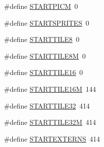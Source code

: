 \begin{DoxyCompactItemize}
\#define \hyperlink{GFXE__WL6_8H_abd418cd2e72de01524b8400b58ad8273}{STARTPICM}~0
\item 
\#define \hyperlink{GFXE__WL6_8H_a08f15ca2b66024c7df43a601df18e33a}{STARTSPRITES}~0
\item 
\#define \hyperlink{GFXE__WL6_8H_a63a36c8955b74ee16ba0fc61f4d62478}{STARTTILE8}~0
\item 
\#define \hyperlink{GFXE__WL6_8H_a56df7bfae7e081f1fe22c67f356c0f12}{STARTTILE8M}~0
\item 
\#define \hyperlink{GFXE__WL6_8H_adde5c841b7c315dca1c114be851a14bf}{STARTTILE16}~0
\item 
\#define \hyperlink{GFXE__WL6_8H_a8158cbe2ebd8e9f311fd7637be063176}{STARTTILE16M}~144
\item 
\#define \hyperlink{GFXE__WL6_8H_afdb080cedc6a487f761df7481033e345}{STARTTILE32}~414
\item 
\#define \hyperlink{GFXE__WL6_8H_a04e773bd033b5375cb82a2bc5142eb3a}{STARTTILE32M}~414
\item 
\#define \hyperlink{GFXE__WL6_8H_a4bab9c7dbc3408ece8bf42a298f4a0ad}{STARTEXTERNS}~414
\end{DoxyCompactItemize}
